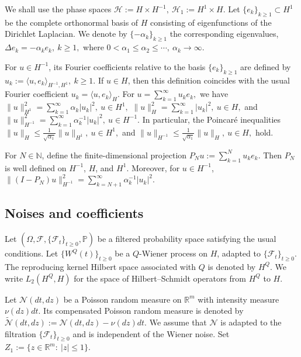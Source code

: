 \documentclass[11pt]{article}
\theoremstyle{plain}
\numberwithin{equation}{section}
\begin{document}
We shall use the phase spaces \(\mathcal H:=H\times H^{-1},~\mathcal H_1:=H^1\times H.\)
Let \(\{e_k\}_{k\ge1}\subset H^1\) be the complete orthonormal basis of
\(H\) consisting of eigenfunctions of the Dirichlet Laplacian. We denote by
\(\{-\alpha_k\}_{k\ge1}\) the corresponding eigenvalues,   \(\Delta e_k=-\alpha_k e_k,~ k\ge1,\)
where \(0<\alpha_1\le \alpha_2\le\cdots,~\alpha_k\to\infty .\)

For \(u\in H^{-1}\), its Fourier coefficients relative to the basis
\(\{e_k\}_{k\ge1}\) are defined by \(u_k:=\langle u,e_k\rangle_{H^{-1},H^1},~ k\ge1.\)
If \(u\in H\), then this definition coincides with the usual Fourier coefficient \(u_k=\langle u,e_k\rangle_H.\)
For \(u=\sum_{k=1}^\infty u_k e_k,\)  we have \(\|u\|_{H^1}^2=\sum_{k=1}^\infty \alpha_k |u_k|^2,~ u\in H^1,\)
\(\|u\|_H^2=\sum_{k=1}^\infty |u_k|^2,~ u\in H,\) and \(\|u\|_{H^{-1}}^2=\sum_{k=1}^\infty \alpha_k^{-1}|u_k|^2, ~ u\in H^{-1}.\)
In particular, the Poincar\'e inequalities \(\|u\|_H \le\frac1{\sqrt{\alpha_1}}\|u\|_{H^1},~ u\in H^1,\)
and \(\|u\|_{H^{-1}}\le\frac1{\sqrt{\alpha_1}}\|u\|_H,~ u\in H,\) hold.

For \(N\in\mathbb N\), define the finite-dimensional projection \(P_Nu:=\sum_{k=1}^N u_k e_k .\)
Then \(P_N\) is well defined on \(H^{-1}\), \(H\), and \(H^1\). Moreover,
for \(u\in H^{-1}\), \(\|(I-P_N)u\|_{H^{-1}}^2=\sum_{k=N+1}^{\infty}\alpha_k^{-1}|u_k|^2.\)




 

\subsection{Noises and coefficients}

Let \((\Omega,\mathcal F,\{\mathcal F_t\}_{t\ge0},\mathbb P)\) be a filtered probability space satisfying the usual conditions. Let
\(\{W^Q(t)\}_{t\ge0}\) be a \(Q\)-Wiener process on \(H\), adapted to \(\{\mathcal F_t\}_{t\ge0}\). The reproducing kernel Hilbert space
associated with \(Q\) is denoted by \(H^Q\). We write \(L_2(H^Q,H)\) for the space of Hilbert--Schmidt operators from \(H^Q\) to \(H\).

Let \(\mathcal N(dt,dz)\) be a Poisson random measure on
\(\mathbb R^m\) with intensity measure \(\nu(dz)dt\). Its compensated
Poisson random measure is denoted by \(\tilde{\mathcal N}(dt,dz):=\mathcal N(dt,dz)-\nu(dz)dt .\)
We assume that \(\mathcal N\) is adapted to the filtration \(\{\mathcal F_t\}_{t\ge0}\) and is independent of the Wiener noise.
Set \(Z_1:=\{z\in\mathbb R^m:\ |z|\le1\}.\)
\end{document}

